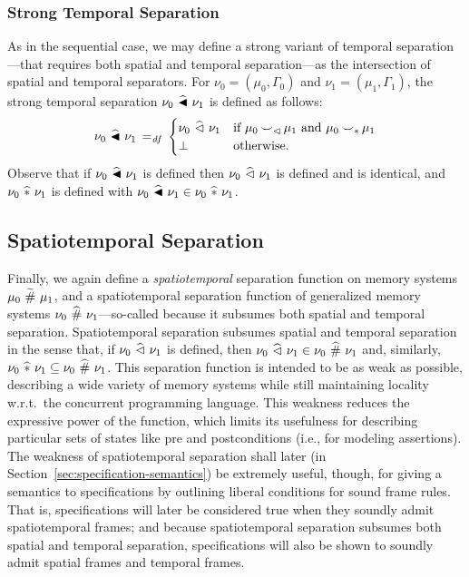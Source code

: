 \documentclass[11pt]{report}
\begin{document}
\subsubsection{Strong Temporal Separation}

As in the sequential case, we may define a strong variant of temporal separation---that requires both spatial and temporal separation---as the intersection of spatial and temporal separators. For $\nu_0 = (\mu_0,\Gamma_0)$ and $\nu_1 = (\mu_1,\Gamma_1)$, the strong temporal separation $\nu_0 \operatorname{\,\widehat{\blacktriangleleft}\,} \nu_1$ is defined as follows: \[ \nu_0 \operatorname{\,\widehat{\blacktriangleleft}\,} \nu_1 \operatorname{\;=_{\mathit{df}}\;} \begin{cases}
  \nu_0 \operatorname{\,\widehat{\vartriangleleft}\,} \nu_1 & \text{if $\mu_0 \operatorname{\smile}_\vartriangleleft \mu_1$ and $\mu_0 \operatorname{\smile}_\ast \mu_1$} \\ 
  \bot & \text{otherwise.}
\end{cases}\] Observe that if $\nu_0 \operatorname{\,\widehat{\blacktriangleleft}\,} \nu_1$ is defined then $\nu_0 \operatorname{\,\widehat{\vartriangleleft}\,} \nu_1$ is defined and is identical, and $\nu_0 \operatorname{\,\widehat{\ast}\,} \nu_1$ is defined with $\nu_0 \operatorname{\,\widehat{\blacktriangleleft}\,} \nu_1 \in \nu_0 \operatorname{\,\widehat{\ast}\,} \nu_1$.

\subsection{Spatiotemporal Separation}
\label{sec:spatiotemporal-separation}

Finally, we again define a \emph{spatiotemporal} separation function on memory systems $\mu_0 \operatorname{\,\widetilde{\#}\,} \mu_1$, and a spatiotemporal separation function of generalized memory systems $\nu_0 \operatorname{\,\widehat{\#}\,} \nu_1$---so-called because it subsumes both spatial and temporal separation. Spatiotemporal separation subsumes spatial and temporal separation in the sense that, if $\nu_0 \operatorname{\,\widehat{\vartriangleleft}\,} \nu_1$ is defined, then $\nu_0 \operatorname{\,\widehat{\vartriangleleft}\,} \nu_1 \in \nu_0 \operatorname{\,\widehat{\#}\,} \nu_1$ and, similarly, $\nu_0 \operatorname{\,\widehat{\ast}\,} \nu_1 \subseteq \nu_0 \operatorname{\,\widehat{\#}\,} \nu_1$. This separation function is intended to be as weak as possible, describing a wide variety of memory systems while still maintaining locality w.r.t.\ the concurrent programming language. This weakness reduces the expressive power of the function, which limits its usefulness for describing particular sets of states like pre and postconditions (i.e., for modeling assertions). The weakness of spatiotemporal separation shall later (in Section~\ref{sec:specification-semantics}) be extremely useful, though, for giving a semantics to specifications by outlining liberal conditions for sound frame rules. That is, specifications will later be considered true when they soundly admit spatiotemporal frames; and because spatiotemporal separation subsumes both spatial and temporal separation, specifications will also be shown to soundly admit spatial frames and temporal frames. 
\end{document}
